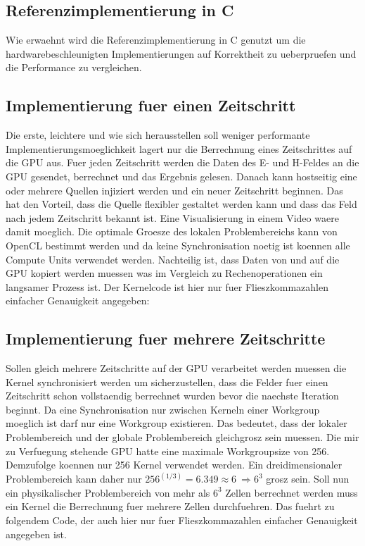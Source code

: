 \documentclass[11pt, ngerman]{article}
\begin{document}
\subsection{Referenzimplementierung in C}
Wie erwaehnt wird die Referenzimplementierung in C genutzt um die hardwarebeschleunigten Implementierungen
auf Korrektheit zu ueberpruefen und die Performance zu vergleichen.



\subsection{Implementierung fuer einen Zeitschritt}
Die erste, leichtere und wie sich herausstellen soll weniger performante Implementierungsmoeglichkeit
lagert nur die Berrechnung eines Zeitschrittes auf die GPU aus. Fuer jeden Zeitschritt werden
die Daten des E- und H-Feldes an die GPU gesendet, berrechnet und das Ergebnis gelesen.
Danach kann hostseitig eine oder mehrere Quellen injiziert werden und ein neuer Zeitschritt beginnen.
Das hat den Vorteil, dass die Quelle flexibler gestaltet werden kann und dass das Feld nach jedem
Zeitschritt bekannt ist. Eine Visualisierung in einem Video waere damit moeglich.
Die optimale Groesze des lokalen Problembereichs kann von OpenCL bestimmt werden und da keine
Synchronisation noetig ist koennen alle Compute Units verwendet werden.
Nachteilig ist, dass Daten von und auf die GPU kopiert werden muessen was 
im Vergleich zu Rechenoperationen ein langsamer Prozess ist.
Der Kernelcode ist hier nur fuer Flieszkommazahlen einfacher Genauigkeit angegeben:




\subsection{Implementierung fuer mehrere Zeitschritte}
Sollen gleich mehrere Zeitschritte auf der GPU verarbeitet werden muessen die Kernel synchronisiert
werden um sicherzustellen, dass die Felder fuer einen Zeitschritt schon vollstaendig berrechnet
wurden bevor die naechste Iteration beginnt. Da eine Synchronisation nur zwischen Kerneln
einer Workgroup moeglich ist darf nur eine Workgroup existieren. Das bedeutet, dass der lokaler
Problembereich und der globale Problembereich gleichgrosz sein muessen.
Die mir zu Verfuegung stehende GPU hatte eine maximale Workgroupsize von 256.
Demzufolge koennen nur 256 Kernel verwendet werden. Ein dreidimensionaler
Problembereich kann daher nur \(256^{(1/3)} = 6.349 \approx 6\ \Rightarrow 6^3\)
grosz sein. Soll nun ein physikalischer Problembereich von mehr als \(6^3\) Zellen
berrechnet werden muss ein Kernel die Berrechnung fuer mehrere Zellen durchfuehren.
Das fuehrt zu folgendem Code, der auch hier nur fuer Flieszkommazahlen einfacher
Genauigkeit angegeben ist.
\end{document}
